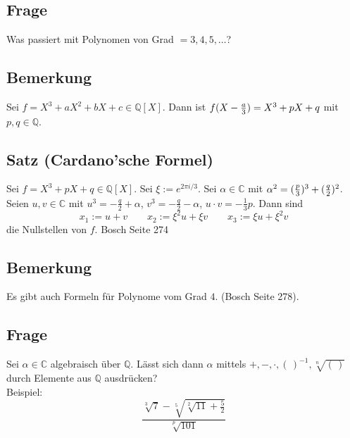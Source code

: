 \subsection[Frage, ob es entsprechende Formeln auch für Polynome höheren Grades gibt]{Frage} %
\label{sub:12.2}
Was passiert mit Polynomen von Grad $=3,4,5, \ldots $?

\subsection[Bemerkung: Formel um Polynome auf die Form für die Cardon'sche Formel zu bringen]{Bemerkung} %
\label{sub:12.3}
Sei $f= X^3+ a X^2 + bX + c \in \mathds{Q}[X]$. Dann ist $f (X- \frac{a}{3} ) = X^3+pX+q $ mit $p,q \in \mathds{Q}$.

\subsection{Satz (Cardano'sche Formel)} %
\label{sub:12.4}
Sei $f= X^3+ pX+q \in \mathds{Q}[X]$. Sei $\xi := e^{2 \pi  i/3}$. Sei $\alpha \in \mathds{C}$ mit $\alpha^2= (\frac{p}{3} )^3+ (\frac{q}{2} )^2  $.
Seien $u,v \in \mathds{C}$ mit $u^3= - \frac{q}{2}+ \alpha $, $v^3= - \frac{q}{2}- \alpha $, $u \cdot v= - \frac{1}{3}p $. Dann sind
\[
	x_1 := u+v \qquad x_2 := \xi^2 u + \xi v \qquad x_3 := \xi u + \xi^2 v
\]
die Nullstellen von $f$.
Bosch Seite 274 \bewende

\subsection[Bemerkung: Es gibt auch Formeln für Polynome mit dem Grad 4]{Bemerkung} %
\label{sub:12.5}
Es gibt auch Formeln für Polynome vom Grad $4$. (Bosch Seite 278).

\subsection[Frage, ob alle algebraischen Elemente durch Grundrechenarten+Wurzeln darstellbar]{Frage} %
\label{sub:12.6}
Sei $\alpha \in \mathds{C}$ algebraisch über $\mathds{Q}$. Lässt sich dann $\alpha$ mittels $+,-, \cdot , (\,)^{-1}, \sqrt[n]{(\,)}  $ durch Elemente aus $\mathds{Q}$ ausdrücken?\\
Beispiel: 
\[
	\frac{\sqrt[3]{7}- \sqrt[5]{\sqrt[2]{11} + \frac{5}{2}  }    }{\sqrt[p]{101}  } 
\]	

